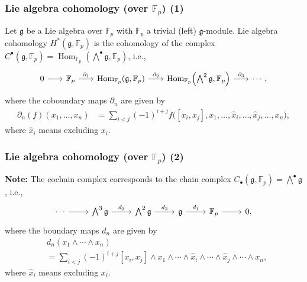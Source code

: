 \documentclass{beamer}
\newcommand*\F{\mathbb{F}}
\DeclareMathOperator{\Hom}{Hom} %
\newcommand*{\lie}[1]{\mathfrak{#1}} %
\newcommand*\Cont{\mathcal{C}}
\begin{document}
\begin{frame}[fragile]
  \frametitle{Lie algebra cohomology (over $\F_p$) (1)}

    Let $\lie{g}$ be a Lie algebra over $\F_p$ with $\F_p$ a trivial (left) $\lie{g}$-module. Lie algebra cohomology $H^{*}(\lie{g},\F_{p})$ is the cohomology of the complex $C^{\bullet}(\lie{g},\F_p) = \Hom_{\F_p}(\bigwedge^{\bullet}\lie{g},\F_p)$, i.e.,
  \[
    \begin{tikzcd}[column sep=scriptsize]
      0 \ar[r] & \F_p \ar[r,"\partial_{1}"] & \Hom_{\F_{p}}(\lie{g},\F_p) \ar[r,"\partial_{2}"] & \Hom_{\F_{p}}\Bigl(\bigwedge^2\lie{g},\F_p\Bigr) \ar[r,"\partial_{3}"] &  \cdots,
    \end{tikzcd}
  \]
  where the coboundary maps $\partial_{n}$ are given by
  \begin{align*}
    \partial_{n}(f)(x_1,\dotsc,x_{n}) &= \sum_{i<j}(-1)^{i+j}f\bigl([x_i,x_j],x_1,\dotsc,\widehat{x}_i,\dotsc,\widehat{x}_j,\dotsc,x_{n}\bigr),
  \end{align*}
  where $\widehat{x}_{i}$ means excluding $x_{i}$.
\end{frame}

\begin{frame}[fragile]
  \frametitle{Lie algebra cohomology (over $\F_p$) (2)}

  \textbf{Note:} The cochain complex corresponds to the chain complex $C_{\bullet}(\lie{g},\F_{p}) = \bigwedge^{\bullet}\lie{g}$, i.e.,
  \[
    \begin{tikzcd}
      \cdots \ar[r] & \bigwedge^{3}\lie{g} \ar[r,"d_{3}"] & \bigwedge^{2}\lie{g} \ar[r,"d_{2}"] & \lie{g} \ar[r,"d_{1}"] & \F_{p} \ar[r] &  0,
    \end{tikzcd}
  \]
  where the boundary maps $d_{n}$ are given by
  \begin{align*}
    &d_{n}(x_1\wedge \dotsb \wedge x_{n}) \\
    &= \sum_{i<j}(-1)^{i+j}[x_i,x_j] \wedge x_1 \wedge \dotsb \wedge \widehat{x}_i \wedge \dotsb \wedge \widehat{x}_j \wedge \dotsb \wedge x_{n},
  \end{align*}
  where $\widehat{x}_{i}$ means excluding $x_{i}$.
\end{frame}



\end{document}
